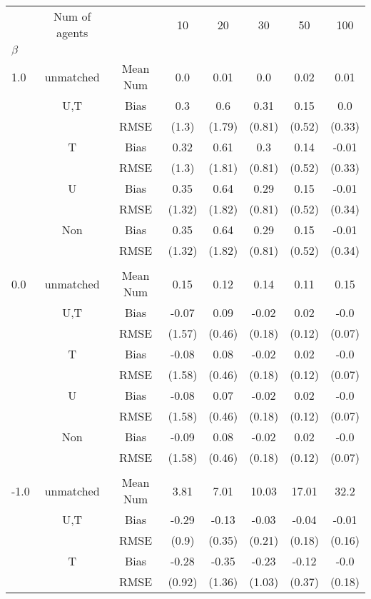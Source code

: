 \begin{tabular}{@{\extracolsep{5pt}}lc|cccccc}
\toprule 
 & Num of agents &  & 10 & 20 & 30 & 50 & 100 \\
$\beta$ &  &  &  &  &  &  &  \\
\midrule 
1.0 & unmatched & Mean Num & 0.0 & 0.01 & 0.0 & 0.02 & 0.01 \\
 & U,T & Bias & 0.3 & 0.6 & 0.31 & 0.15 & 0.0 \\
 &  & RMSE & (1.3) & (1.79) & (0.81) & (0.52) & (0.33) \\
 & T & Bias & 0.32 & 0.61 & 0.3 & 0.14 & -0.01 \\
 &  & RMSE & (1.3) & (1.81) & (0.81) & (0.52) & (0.33) \\
 & U & Bias & 0.35 & 0.64 & 0.29 & 0.15 & -0.01 \\
 &  & RMSE & (1.32) & (1.82) & (0.81) & (0.52) & (0.34) \\
 & Non & Bias & 0.35 & 0.64 & 0.29 & 0.15 & -0.01 \\
 &  & RMSE & (1.32) & (1.82) & (0.81) & (0.52) & (0.34) \\
 &  &  &  &  &  &  &  \\
0.0 & unmatched & Mean Num & 0.15 & 0.12 & 0.14 & 0.11 & 0.15 \\
 & U,T & Bias & -0.07 & 0.09 & -0.02 & 0.02 & -0.0 \\
 &  & RMSE & (1.57) & (0.46) & (0.18) & (0.12) & (0.07) \\
 & T & Bias & -0.08 & 0.08 & -0.02 & 0.02 & -0.0 \\
 &  & RMSE & (1.58) & (0.46) & (0.18) & (0.12) & (0.07) \\
 & U & Bias & -0.08 & 0.07 & -0.02 & 0.02 & -0.0 \\
 &  & RMSE & (1.58) & (0.46) & (0.18) & (0.12) & (0.07) \\
 & Non & Bias & -0.09 & 0.08 & -0.02 & 0.02 & -0.0 \\
 &  & RMSE & (1.58) & (0.46) & (0.18) & (0.12) & (0.07) \\
 &  &  &  &  &  &  &  \\
-1.0 & unmatched & Mean Num & 3.81 & 7.01 & 10.03 & 17.01 & 32.2 \\
 & U,T & Bias & -0.29 & -0.13 & -0.03 & -0.04 & -0.01 \\
 &  & RMSE & (0.9) & (0.35) & (0.21) & (0.18) & (0.16) \\
 & T & Bias & -0.28 & -0.35 & -0.23 & -0.12 & -0.0 \\
 &  & RMSE & (0.92) & (1.36) & (1.03) & (0.37) & (0.18) \\

\end{tabular}

